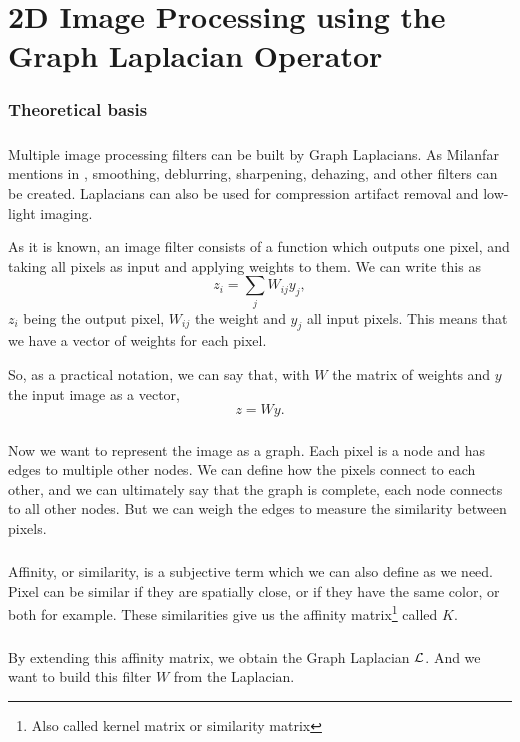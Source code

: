 \chapter{2D Image Processing using the Graph Laplacian Operator}

\subsection{Theoretical basis}

\paragraph{}
Multiple image processing filters can be built by Graph Laplacians. As Milanfar mentions in \cite{siam_slides_2016}, smoothing, deblurring, sharpening, dehazing, and other filters can be created. Laplacians can also be used for compression artifact removal and low-light imaging.

As it is known, an image filter consists of a function which outputs one pixel, and taking all pixels as input and applying weights to them. We can write this as
\[z_i = \sum_j W_{ij}y_j,\]
\(z_i\) being the output pixel, \(W_{ij}\) the weight and \(y_j\) all input pixels.
This means that we have a vector of weights for each pixel.

So, as a practical notation, we can say that, with \(W\) the matrix of weights and \(y\) the input image as a vector,
\[z = Wy.\]

\paragraph{}
Now we want to represent the image as a graph.
Each pixel is a node and has edges to multiple other nodes.
We can define how the pixels connect to each other, and we can ultimately say that the graph is complete, each node connects to all other nodes.
But we can weigh the edges to measure the similarity between pixels.

\paragraph{}
Affinity, or similarity, is a subjective term which we can also define as we need.
Pixel can be similar if they are spatially close, or if they have the same color, or both for example.
These similarities give us the affinity matrix\footnote{Also called kernel matrix or similarity matrix} called \(K\).

\paragraph{}
By extending this affinity matrix, we obtain the Graph Laplacian \(\operatorname{\mathcal{L}}\).
And we want to build this filter \(W\) from the Laplacian.

